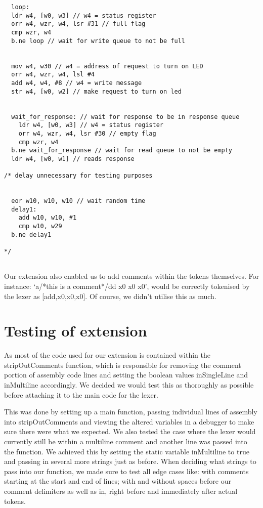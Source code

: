 \documentclass[11pt]{article}
\begin{document}
\begin{verbatim}
  loop:
  ldr w4, [w0, w3] // w4 = status register
  orr w4, wzr, w4, lsr #31 // full flag
  cmp wzr, w4
  b.ne loop // wait for write queue to not be full
 
 
  mov w4, w30 // w4 = address of request to turn on LED
  orr w4, wzr, w4, lsl #4
  add w4, w4, #8 // w4 = write message
  str w4, [w0, w2] // make request to turn on led
 
 
  wait_for_response: // wait for response to be in response queue
    ldr w4, [w0, w3] // w4 = status register
    orr w4, wzr, w4, lsr #30 // empty flag
    cmp wzr, w4
  b.ne wait_for_response // wait for read queue to not be empty
  ldr w4, [w0, w1] // reads response
 
/* delay unnecessary for testing purposes


  eor w10, w10, w10 // wait random time
  delay1:
    add w10, w10, #1
    cmp w10, w29
  b.ne delay1
 
*/


\end{verbatim}


Our extension also enabled us to add comments within the tokens themselves. For instance:
‘a/*this is a comment*/dd x0 x0 x0’, would be correctly tokenised by the lexer as [add,x0,x0,x0]. Of course, we didn’t utilise this as much.

\section{Testing of extension}
As most of the code used for our extension is contained within the stripOutComments function, which is responsible for removing the comment portion of assembly code lines and setting the boolean values inSingleLine and inMultiline accordingly. We decided we would test this as thoroughly as possible before attaching it to the main code for the lexer.

This was done by setting up a main function, passing individual lines of assembly into stripOutComments and viewing the altered variables in a debugger to make sure there were what we expected. We also tested the case where the lexer would currently still be within a multiline comment and another line was passed into the function. We achieved this by setting the static variable inMultiline to true and passing in several more strings just as before. When deciding what strings to pass into our function, we made sure to test all edge cases like: with comments starting at the start and end of lines; with and without spaces before our comment delimiters as well as in, right before and immediately after actual tokens.
\end{document}
